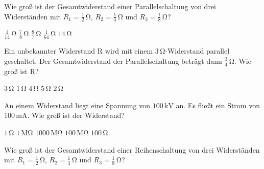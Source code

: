 \documentclass[11pt]{exam}
\begin{document}
\setlength{\voffset}{-0.5in}
\setlength{\headsep}{5pt}

\hspace{2mm}
 \hspace{5mm}
\vspace{4mm}

\begin{questions}

\question Wie groß ist der Gesamtwiderstand einer Parallelschaltung von drei Widerständen mit \(R_1=\mathrm{\frac{1}{2}\,\Omega}\), \(R_2=\mathrm{\frac{1}{4}\,\Omega}\) und \(R_3=\mathrm{\frac{1}{8}\,\Omega}\)?

\begin{choices}
	\choice \(\mathrm{\frac{1}{14}\,\Omega}\)
	\choice \(\mathrm{\frac{7}{8}\,\Omega}\)
	\choice \(\mathrm{\frac{8}{7}\,\Omega}\)
	\choice \(\mathrm{\frac{1}{64}\,\Omega}\)
	\choice \(\mathrm{14\,\Omega}\)
\end{choices}

\vspace{3mm}\question Ein unbekannter Widerstand \(\mathrm{R}\) wird mit einem \(\mathrm{3\,\Omega}\)-Widerstand parallel geschaltet. Der Gesamtwiderstand der Parallelschaltung beträgt dann \(\mathrm{\frac{3}{4}\,\Omega}\). Wie groß ist \(\mathrm{R}\)?

\begin{choices}
	\choice \(\mathrm{3\,\Omega}\)
	\choice \(\mathrm{1\,\Omega}\)
	\choice \(\mathrm{4\,\Omega}\)
	\choice \(\mathrm{5\,\Omega}\)
	\choice \(\mathrm{2\,\Omega}\)
\end{choices}

\vspace{3mm}\question An einem Widerstand liegt eine Spannung von \(\mathrm{100\,kV}\) an. Es fließt ein Strom von \(\mathrm{100\,mA}\). Wie groß ist der Widerstand?

\begin{choices}
	\choice \(\mathrm{1\,\Omega}\)
	\choice \(\mathrm{1\,M\Omega}\)
	\choice \(\mathrm{1000\,M\Omega}\)
	\choice \(\mathrm{100\,M\Omega}\)
	\choice \(\mathrm{100\,\Omega}\)
\end{choices}

\vspace{3mm}\question Wie groß ist der Gesamtwiderstand einer Reihenschaltung von drei Widerständen mit \(R_1=\mathrm{\frac{1}{2}\,\Omega}\), \(R_2=\mathrm{\frac{1}{4}\,\Omega}\) und \(R_3=\mathrm{\frac{1}{8}\,\Omega}\)?


\end{questions}
\end{document}
